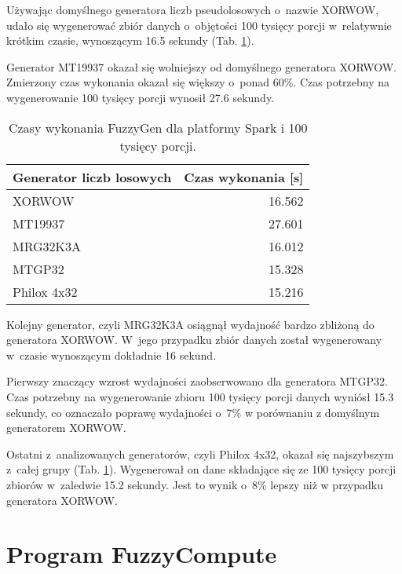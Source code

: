 Używając domyślnego generatora liczb pseudolosowych o~nazwie XORWOW, udało się wygenerować zbiór danych
o~objętości 100 tysięcy porcji w~relatywnie krótkim czasie, wynoszącym 16.5 sekundy (Tab. \ref{tab:fuzzygen:generators}).

Generator MT19937 okazał się wolniejszy od domyślnego generatora XORWOW. Zmierzony czas wykonania okazał
się większy o~ponad 60\%. Czas potrzebny na wygenerowanie 100 tysięcy porcji wynosił 27.6 sekundy.

\begin{table}[h]
    \centering
    \caption{Czasy wykonania FuzzyGen dla platformy Spark i 100 tysięcy porcji.}
    \begin{tabular}{ | l | r | }
        \hline
        Generator liczb losowych & Czas wykonania [s] \\
        \hline
        XORWOW                   & 16.562             \\
        MT19937                  & 27.601             \\
        MRG32K3A                 & 16.012             \\
        MTGP32                   & 15.328             \\
        Philox 4x32              & 15.216             \\
        \hline
    \end{tabular}
    \label{tab:fuzzygen:generators}
\end{table}

Kolejny generator, czyli MRG32K3A osiągnął wydajność bardzo zbliżoną do generatora XORWOW. W~jego
przypadku zbiór danych został wygenerowany w~czasie wynoszącym dokładnie 16 sekund.

Pierwszy znaczący wzrost wydajności zaobserwowano dla generatora MTGP32. Czas potrzebny na wygenerowanie
zbioru 100 tysięcy porcji danych wyniósł 15.3 sekundy, co oznaczało poprawę wydajności o~7\% w porównaniu z
domyślnym generatorem XORWOW.

Ostatni z~analizowanych generatorów, czyli Philox 4x32, okazał się najszybszym z~całej grupy
(Tab. \ref{tab:fuzzygen:generators}). Wygenerował on dane składające się ze 100 tysięcy porcji zbiorów
w~zaledwie 15.2 sekundy. Jest to wynik o~8\% lepszy niż w przypadku generatora XORWOW.

\section{Program FuzzyCompute}

